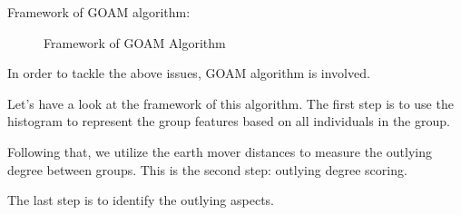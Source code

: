 \documentclass[
size=14pt,
paper=smartboard,  %
mode=present, 		%
display=slides, 	%
style=tuliplab,  	%
pauseslide,
fleqn,leqno]{powerdot}
\begin{document}
	
	\begin{slide}[toc=,bm=]{}
		
		Framework of GOAM algorithm:
		
		\bigskip
		
		\begin{figure}
			\centering
			\caption{Framework of GOAM Algorithm} \label{framework}
		\end{figure}
		
		\begin{note}
			In order to tackle the above issues,
			GOAM algorithm is involved.
			
			Let's have a look at the framework of this algorithm.
			The first step is to use the histogram to represent the group features
			based on all individuals in the group.
			
			Following that,
			we utilize the earth mover distances to measure the
			outlying degree between groups.
			This is the second step:
			outlying degree scoring.
			
			The last step is to identify the outlying aspects.
			
		\end{note}
		
	\end{slide}
	
\end{document}
